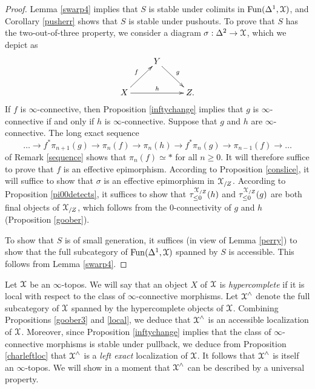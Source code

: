 \begin{proof}
Lemma \ref{swarp4} implies that $S$ is stable under colimits in $\operatorname{Fun}(\Delta^1,\operatorname{\mathcal{X}})$, and
Corollary \ref{pusherr} shows that $S$ is stable under pushouts. To prove that $S$ has the two-out-of-three property, we consider a diagram $\sigma: \Delta^2 \rightarrow \operatorname{\mathcal{X}}$, which we depict as
$$ \xymatrix{ & Y \ar[dr]^{g} & \\
X \ar[ur]^{f} \ar[rr]^{h} & & Z. }$$
If $f$ is $\infty$-connective, then Proposition \ref{inftychange} implies that $g$
is $\infty$-connective if and only if $h$ is $\infty$-connective. Suppose that $g$ and $h$
are $\infty$-connective. The long exact sequence
$$\ldots \rightarrow f^{\ast} \pi_{n+1}(g) \rightarrow \pi_n(f) \rightarrow \pi_n(h) \rightarrow f^{\ast}
\pi_n(g) \rightarrow \pi_{n-1}(f) \rightarrow \ldots$$ 
of Remark \ref{sequence} shows that $\pi_n(f) \simeq \ast$ for all $n \geq 0$. It
will therefore suffice to prove that $f$ is an effective epimorphism. According to Proposition \ref{conslice}, it will suffice to show that $\sigma$ is an effective epimorphism in 
$\operatorname{\mathcal{X}}_{/Z}$. According to Proposition \ref{pi00detects}, it suffices to show that
$\tau_{\leq 0}^{\operatorname{\mathcal{X}}_{/Z}}(h)$ and $\tau_{\leq 0}^{\operatorname{\mathcal{X}}_{/Z}}(g)$ are both final objects of
$\operatorname{\mathcal{X}}_{/Z}$, which follows from the $0$-connectivity of $g$ and $h$ (Proposition \ref{goober}). 

To show that $S$ is of small generation, it suffices (in view of Lemma \ref{perry}) to show that
the full subcategory of $\operatorname{Fun}(\Delta^1,\operatorname{\mathcal{X}})$ spanned by $S$ is accessible. This follows from Lemma \ref{swarp4}.
\end{proof}

Let $\operatorname{\mathcal{X}}$ be an $\infty$-topos. We will say that an object $X$ of $\operatorname{\mathcal{X}}$ is
{\it hypercomplete} if it is local with respect to the class of $\infty$-connective morphisms. 
Let $\operatorname{\mathcal{X}}^{\wedge}$ denote the full subcategory of $\operatorname{\mathcal{X}}$ spanned by the hypercomplete objects of $\operatorname{\mathcal{X}}$. Combining Propositions \ref{goober3} and \ref{local}, we deduce that
$\operatorname{\mathcal{X}}^{\wedge}$ is an accessible localization of $\operatorname{\mathcal{X}}$. Moreover, since Proposition \ref{inftychange} implies that the class of $\infty$-connective morphisms is stable under pullback, we deduce from Proposition \ref{charleftloc} that $\operatorname{\mathcal{X}}^{\wedge}$ is a {\em left exact} localization
of $\operatorname{\mathcal{X}}$. It follows that $\operatorname{\mathcal{X}}^{\wedge}$ is itself an $\infty$-topos. We will show in a moment that
$\operatorname{\mathcal{X}}^{\wedge}$ can be described by a universal property.

